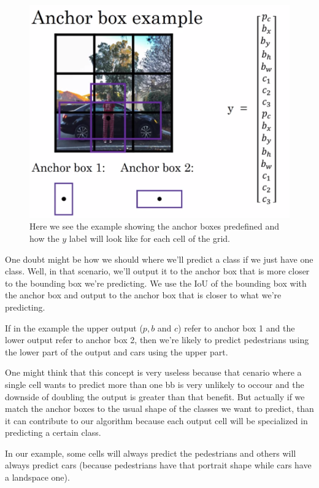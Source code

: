 \documentclass[12pt, a4paper, oneside]{book}
\begin{document}
\begin{figure}[h]
\centering
\includegraphics[scale=0.4]{Res/anchor_box_example.png}
\caption{Here we see the example showing the anchor boxes predefined and how the
$y$ label will look like for each cell of the grid.}
\label{anchor_box_example.png}
\end{figure}

One doubt might be how we should where we'll predict a class if we just have one
class. Well, in that scenario, we'll output it to the anchor box that is more
closer to the bounding box we're predicting. We use the IoU of the bounding box
with the anchor box and output to the anchor box that is closer to what we're
predicting.

If in the example the upper output ($p, b$ and $c$) refer to anchor box 1 and
the lower output refer to anchor box 2, then we're likely to predict pedestrians
using the lower part of the output and cars using the upper part.

One might think that this concept is very useless because that cenario where a
single cell wants to predict more than one bb is very unlikely to occour and the
downside of doubling the output is greater than that benefit. But actually if we
match the anchor boxes to the usual shape of the classes we want to predict,
than it can contribute to our algorithm because each output cell will be
specialized in predicting a certain class.

In our example, some cells will always predict the pedestrians and others will
always predict cars (because pedestrians have that portrait shape while cars
have a landspace one).
\end{document}
